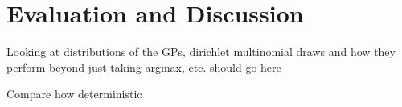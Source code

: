 \chapter{Evaluation and Discussion} \label{chap:evaluation}

Looking at distributions of the GPs, dirichlet multinomial draws and how they perform beyond just taking argmax, etc. should go here

Compare how deterministic
